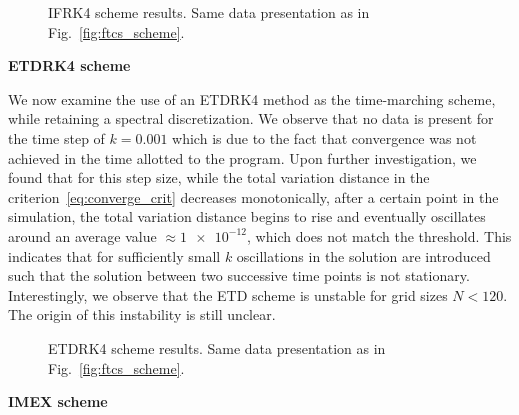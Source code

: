 \documentclass[11pt]{article}
\begin{document}
\begin{figure}[!h]
    \centering
    \caption{IFRK4 scheme results. Same data presentation as in Fig.~\ref{fig:ftcs_scheme}.}
    \label{fig:ifrk4_scheme}
\end{figure}

\noindent\textbf{ETDRK4 scheme}

We now examine the use of an ETDRK4 method as the time-marching scheme, while retaining a spectral discretization. We observe that no data is present for the time step of $k=0.001$ which is due to the fact that convergence was not achieved in the time allotted to the program. Upon further investigation, we found that for this step size, while the total variation distance in the criterion~\eqref{eq:converge_crit} decreases monotonically, after a certain point in the simulation, the total variation distance begins to rise and eventually oscillates around an average value $\approx \num{1e-12}$, which does not match the threshold.  This indicates that for sufficiently small $k$ oscillations in the solution are introduced such that the solution between two successive time points is not stationary.
Interestingly, we observe that the ETD scheme is unstable for grid sizes $N < 120$. The origin of this instability is still unclear. \\

\begin{figure}[!h]
    \centering
    \caption{ETDRK4 scheme results. Same data presentation as in Fig.~\ref{fig:ftcs_scheme}.}
    \label{fig:etdrk4_scheme}
\end{figure}

\noindent\textbf{IMEX scheme}
\end{document}
